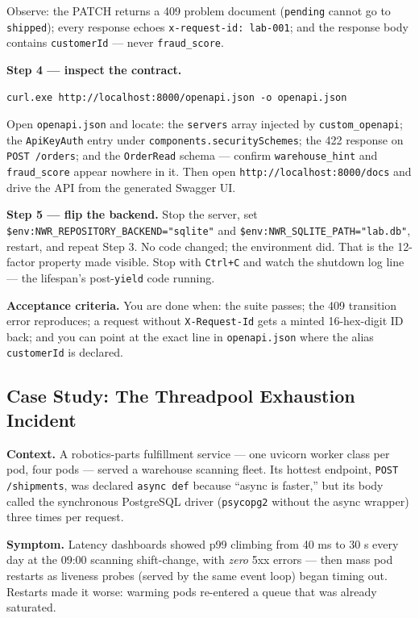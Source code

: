 Observe: the PATCH returns a 409 problem document (\texttt{pending} cannot go
to \texttt{shipped}); every response echoes \texttt{x-request-id: lab-001};
and the response body contains \texttt{customerId} --- never
\texttt{fraud\_score}.

\textbf{Step 4 --- inspect the contract.}

\begin{verbatim}
curl.exe http://localhost:8000/openapi.json -o openapi.json
\end{verbatim}

Open \texttt{openapi.json} and locate: the \texttt{servers} array injected by
\texttt{custom\_openapi}; the \texttt{ApiKeyAuth} entry under
\texttt{components.securitySchemes}; the 422 response on
\texttt{POST /orders}; and the \texttt{OrderRead} schema --- confirm
\texttt{warehouse\_hint} and \texttt{fraud\_score} appear nowhere in it.
Then open \texttt{http://localhost:8000/docs} and drive the API from the
generated Swagger UI.

\textbf{Step 5 --- flip the backend.} Stop the server, set
\texttt{\$env:NWR\_REPOSITORY\_BACKEND="sqlite"} and
\texttt{\$env:NWR\_SQLITE\_PATH="lab.db"}, restart, and repeat Step 3. No
code changed; the environment did. That is the 12-factor property made
visible. Stop with \texttt{Ctrl+C} and watch the shutdown log line --- the
lifespan's post-\texttt{yield} code running.

\textbf{Acceptance criteria.} You are done when: the suite passes; the 409
transition error reproduces; a request without \texttt{X-Request-Id} gets a
minted 16-hex-digit ID back; and you can point at the exact line in
\texttt{openapi.json} where the alias \texttt{customerId} is declared.

\subsection{Case Study: The Threadpool Exhaustion Incident}
\label{sec:ch6-case-study}

\textbf{Context.} A robotics-parts fulfillment service --- one uvicorn worker
class per pod, four pods --- served a warehouse scanning fleet. Its hottest
endpoint, \texttt{POST /shipments}, was declared \texttt{async def} because
``async is faster,'' but its body called the synchronous PostgreSQL driver
(\texttt{psycopg2} without the async wrapper) three times per request.

\textbf{Symptom.} Latency dashboards showed p99 climbing from 40 ms to 30 s
every day at the 09:00 scanning shift-change, with \emph{zero} 5xx errors ---
then mass pod restarts as liveness probes (served by the same event loop)
began timing out. Restarts made it worse: warming pods re-entered a queue
that was already saturated.

